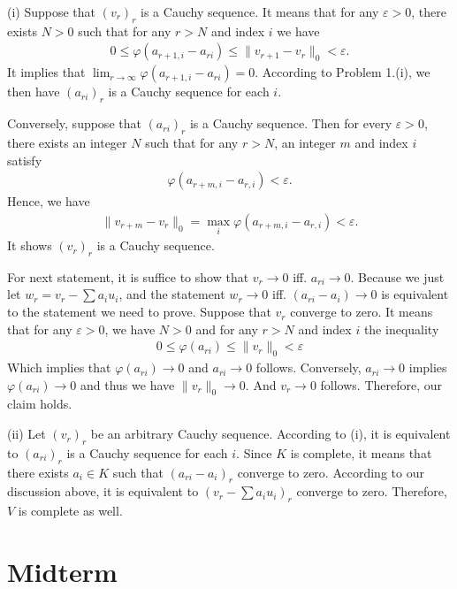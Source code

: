 \begin{solution}
    (i) Suppose that $(v_r)_r$ is a Cauchy sequence. It means that for any $\varepsilon>0$, there exists $N>0$ such that for any $r>N$ and index $i$ we have 
    \begin{align*}
       0\le \varphi(a_{r+1,i}-a_{ri})\le \|v_{r+1}-v_r\|_0  <\varepsilon.
    \end{align*}
    It implies that $\lim_{r\to\infty}\varphi(a_{r+1,i}-a_{ri}) = 0$. According to Problem 1.(i), we then have $(a_{ri})_r$ is a Cauchy sequence for each $i$.
    
    Conversely, suppose that $(a_{ri})_r$ is a Cauchy sequence. Then for every $\varepsilon>0$, there exists an integer $N$ such that for any $r>N$, an integer $m$ and index $i$ satisfy 
    \begin{align*}
        \varphi(a_{r+m,i}-a_{r,i})<\varepsilon.
    \end{align*}
    Hence, we have 
    \begin{align*}
        \|v_{r+m}-v_r\|_0 = \max_{i}\varphi(a_{r+m,i}-a_{r,i})<\varepsilon.
    \end{align*}
    It shows $(v_r)_r$ is a Cauchy sequence.

    For next statement, it is suffice to show that $v_r \to 0$ iff. $a_{ri}\to 0$. 
    Because we just let $w_r = v_r - \sum a_iu_i$, and the statement $w_r\to 0$ iff. $(a_{ri}-a_i) \to 0$ is equivalent to the statement we need to prove.
    Suppose that $v_r$ converge to zero. It means that for any $\varepsilon>0$, we have $N>0$ and for any $r>N$ and index $i$ the inequality
    \begin{align*}
        0\le \varphi(a_{ri})\le \|v_r\|_0<\varepsilon
    \end{align*}
    Which implies that $\varphi(a_{ri})\to 0$ and $a_{ri}\to 0$ follows. Conversely, $a_{ri}\to 0$ implies $\varphi(a_{ri})\to 0$ and thus we have $\|v_r\|_0\to 0$. And $v_r\to 0$ follows.
    Therefore, our claim holds.


    (ii) Let $(v_r)_r$ be an arbitrary Cauchy sequence. According to (i), it is equivalent to $(a_{ri})_r$ is a Cauchy sequence for each $i$.
    Since $K$ is complete, it means that there exists $a_i\in K$ such that $(a_{ri}-a_i)_r$ converge to zero. According to our discussion above, it is equivalent to 
    $(v_r-\sum a_iu_i)_r$ converge to zero. Therefore, $V$ is complete as well. 
\end{solution}



\section{Midterm}
